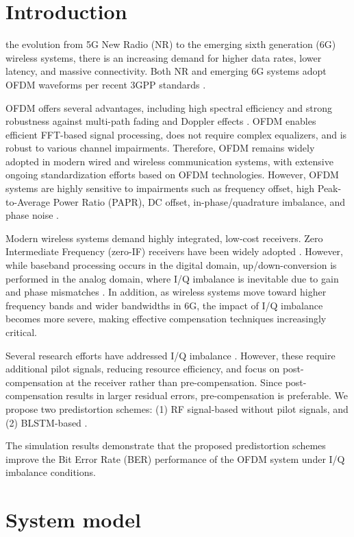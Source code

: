 \documentclass[lettersize,journal]{IEEEtran}
\begin{document}
\section{Introduction}
 the evolution from 5G New Radio (NR) to the emerging sixth generation (6G) wireless systems, there is an increasing demand for higher data rates, lower latency, and massive connectivity.
Both NR and emerging 6G systems adopt OFDM waveforms per recent 3GPP standards \cite{REF1, RP-25xxxx, RP-252912}.

OFDM offers several advantages, including high spectral efficiency and strong robustness against multi-path fading and Doppler effects \cite{Prasad}.
OFDM enables efficient FFT-based signal processing, does not require complex equalizers, and is robust to various channel impairments.
Therefore, OFDM remains widely adopted in modern wired and wireless communication systems, with extensive ongoing standardization efforts based on OFDM technologies.
However, OFDM systems are highly sensitive to impairments such as frequency offset, high Peak-to-Average Power Ratio (PAPR), DC offset, in-phase/quadrature imbalance, and phase noise \cite{REF4, REF5}.

Modern wireless systems demand highly integrated, low-cost receivers.
Zero Intermediate Frequency (zero-IF) receivers have been widely adopted \cite{REF6}.
However, while baseband processing occurs in the digital domain, up/down-conversion is performed in the analog domain, where I/Q imbalance is inevitable due to gain and phase mismatches \cite{Razavi}.
In addition, as wireless systems move toward higher frequency bands and wider bandwidths in 6G, the impact of I/Q imbalance becomes more severe, making effective compensation techniques 
increasingly critical.

Several research efforts have addressed I/Q imbalance \cite{REF7, REF8, REF9}.
However, these require additional pilot signals, reducing resource efficiency, and focus on post-compensation at the receiver rather than pre-compensation.
Since post-compensation results in larger residual errors, pre-compensation is preferable.
We propose two predistortion schemes: (1) RF signal-based without pilot signals, and (2) BLSTM-based \cite{REF10, REF11, REF12}.

The simulation results demonstrate that the proposed predistortion schemes improve the Bit Error Rate (BER) performance of the OFDM system under I/Q imbalance conditions.

\section{System model}
\end{document}
